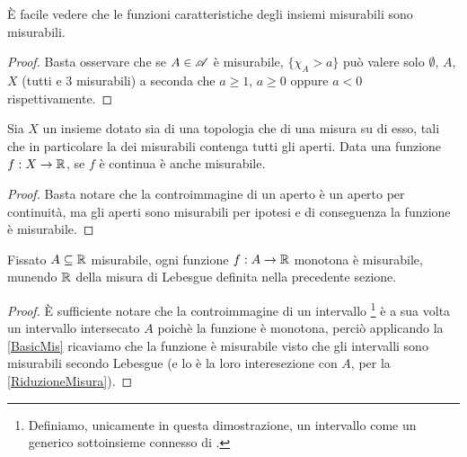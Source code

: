 \begin{remark}
	\label{CarMis}
	È facile vedere che le funzioni caratteristiche degli insiemi misurabili sono misurabili.
\end{remark}
\begin{proof}
	Basta osservare che se $A\in \mathscr A$ è misurabile, $\{ \chi_A > a\}$ può valere solo $\emptyset$, $A$, $X$ (tutti e 3 misurabili) a seconda che
	$a\geq 1$, $a\geq 0$ oppure $a < 0$ rispettivamente.
\end{proof}

\begin{remark}\label{ContinueMisurabili}
	Sia $X$ un insieme dotato sia di una topologia che di una misura su di esso, tali che in particolare la \sigalg{} dei misurabili contenga tutti gli aperti.
	Data una funzione $f:X\to\mathbb R$, se $f$ è continua è anche misurabile.
\end{remark}
\begin{proof}
	Basta notare che la controimmagine di un aperto è un aperto per continuità, ma gli aperti sono misurabili per ipotesi e di conseguenza la funzione è misurabile.
\end{proof}

\begin{remark}\label{MonotoneMisurabili}
	Fissato $A\subseteq \mathbb R$ misurabile, ogni funzione $f:A\to\mathbb R$ monotona è misurabile, munendo $\mathbb R$ della misura di Lebesgue definita nella precedente sezione.
\end{remark}
\begin{proof}
	È sufficiente notare che la controimmagine di un intervallo \footnote{Definiamo, unicamente in questa dimostrazione, un intervallo come un generico sottoinsieme connesso di \R.} è a sua volta un intervallo intersecato $A$ poichè la funzione è monotona, perciò applicando la \cref{BasicMis} ricaviamo che la funzione è misurabile visto che gli intervalli sono misurabili secondo Lebesgue (e lo è la loro interesezione con $A$, per la \cref{RiduzioneMisura}).
\end{proof}

